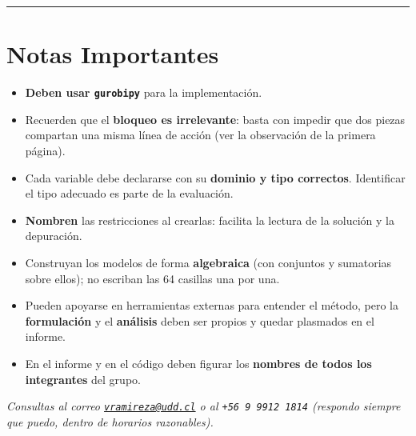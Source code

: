 \documentclass[12pt,a4paper]{article}
\begin{document}
\noindent\rule{\linewidth}{0.4pt}

\section*{Notas Importantes}

\begin{itemize}[topsep=2pt]
    \item \textbf{Deben usar \texttt{gurobipy}} para la implementación.
    \item Recuerden que el \textbf{bloqueo es irrelevante}: basta con impedir que
          dos piezas compartan una misma línea de acción (ver la observación de la
          primera página).
    \item Cada variable debe declararse con su \textbf{dominio y tipo correctos}.
          Identificar el tipo adecuado es parte de la evaluación.
    \item \textbf{Nombren} las restricciones al crearlas: facilita la lectura de la
          solución y la depuración.
    \item Construyan los modelos de forma \textbf{algebraica} (con conjuntos y
          sumatorias sobre ellos); no escriban las 64 casillas una por una.
    \item Pueden apoyarse en herramientas externas para entender el método, pero la
          \textbf{formulación} y el \textbf{análisis} deben ser propios y quedar
          plasmados en el informe.
    \item En el informe y en el código deben figurar los \textbf{nombres de todos
          los integrantes} del grupo.
\end{itemize}

\vspace{1em}
\begin{center}
\textit{Consultas al correo
\href{mailto:vramireza@udd.cl}{\texttt{vramireza@udd.cl}} o al
\texttt{+56\,9\,9912\,1814}
(respondo siempre que puedo, dentro de horarios razonables).}
\end{center}

\end{document}
